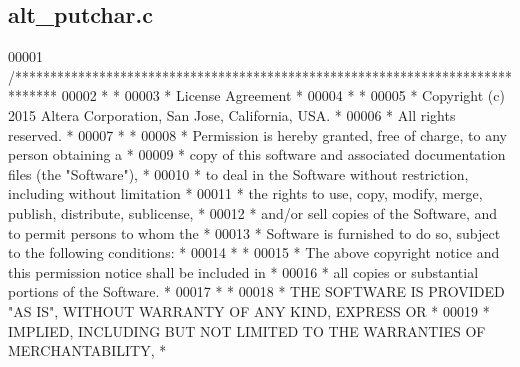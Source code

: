 \subsection{alt\+\_\+putchar.\+c}
\label{alt__putchar_8c_source}

\begin{DoxyCode}
00001 \textcolor{comment}{/******************************************************************************}
00002 \textcolor{comment}{*                                                                             *}
00003 \textcolor{comment}{* License Agreement                                                           *}
00004 \textcolor{comment}{*                                                                             *}
00005 \textcolor{comment}{* Copyright (c) 2015 Altera Corporation, San Jose, California, USA.           *}
00006 \textcolor{comment}{* All rights reserved.                                                        *}
00007 \textcolor{comment}{*                                                                             *}
00008 \textcolor{comment}{* Permission is hereby granted, free of charge, to any person obtaining a     *}
00009 \textcolor{comment}{* copy of this software and associated documentation files (the "Software"),  *}
00010 \textcolor{comment}{* to deal in the Software without restriction, including without limitation   *}
00011 \textcolor{comment}{* the rights to use, copy, modify, merge, publish, distribute, sublicense,    *}
00012 \textcolor{comment}{* and/or sell copies of the Software, and to permit persons to whom the       *}
00013 \textcolor{comment}{* Software is furnished to do so, subject to the following conditions:        *}
00014 \textcolor{comment}{*                                                                             *}
00015 \textcolor{comment}{* The above copyright notice and this permission notice shall be included in  *}
00016 \textcolor{comment}{* all copies or substantial portions of the Software.                         *}
00017 \textcolor{comment}{*                                                                             *}
00018 \textcolor{comment}{* THE SOFTWARE IS PROVIDED "AS IS", WITHOUT WARRANTY OF ANY KIND, EXPRESS OR  *}
00019 \textcolor{comment}{* IMPLIED, INCLUDING BUT NOT LIMITED TO THE WARRANTIES OF MERCHANTABILITY,    *}

\end{DoxyCode}

